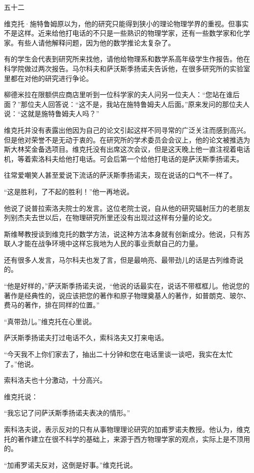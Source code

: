 五十二

维克托·施特鲁姆原以为，他的研究只能得到狭小的理论物理学界的重视。但事实不是这样。近来给他打电话的不只是一些熟识的物理学家，还有一些数学家和化学家。有些人请他解释问题，因为他的数学推论太复杂了。

有的学生会代表到研究所来找他，请他给物理系和数学系高年级学生作报告。他在科学院做过两次报告。马尔科夫和萨沃斯季扬诺夫告诉他，在很多研究所的实验室里都在对他的研究进行争论。

柳德米拉在限额供应商店里听到一位科学家的夫人问另一位夫人：“您站在谁后面？”那位夫人回答说：“这不是，我站在施特鲁姆夫人后面。”原来发问的那位夫人说：“这就是施特鲁姆夫人吗？”

维克托并没有表露出他因为自己的论文引起这样不同寻常的广泛关注而感到高兴。但是他对荣誉不是无动于衷的。在研究所的学术委员会会议上，他的论文被推选为斯大林奖金备选项目。维克托没有出席这次会议，但是这天晚上他一直注视着电话机，等着索洛科夫给他打电话。可会后第一个给他打电话的是萨沃斯季扬诺夫。

往常爱嘲笑人甚至爱说下流话的萨沃斯季扬诺夫，现在说话的口气不一样了。

“这是胜利，了不起的胜利！”他一再地说。

他说了说普拉索洛夫院士的发言。这位老院士说，自从他的研究辐射压力的老朋友列别杰夫去世以后，在物理研究所里还没有出现过这样有分量的论文。

斯维琴教授谈到维克托的数学方法，说这种方法本身就有创新成分。他说，只有苏联人才能在战争环境中这样忘我地为人民的事业贡献自己的力量。

还有很多人发言，马尔科夫也发了言，但是最响亮、最带劲儿的话是古列维奇说的。

“他是好样的，”萨沃斯季扬诺夫说，“他说的话最实在，说话不带框框儿。他说您的著作是经典性的，说应该把您的著作和原子物理奠基人的著作，如普朗克、玻尔、费马的著作，排在同样的位置。”

“真带劲儿。”维克托在心里说。

萨沃斯季扬诺夫打过电话不久，索科洛夫又打来电话。

“今天我不上你们家去了，抽出二十分钟和您在电话里谈一谈吧，我实在太忙了。”他说。

索科洛夫也十分激动，十分高兴。

维克托说：

“我忘记了问萨沃斯季扬诺夫表决的情形。”

索科洛夫说，表示反对的只有从事物理理论研究的加甫罗诺夫教授。他认为，维克托的著作建立在很不科学的基础上，来源于西方物理学家的观点，实际上是不顶用的。

“加甫罗诺夫反对，这倒是好事。”维克托说。


